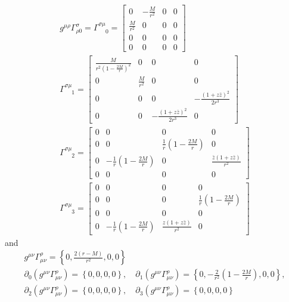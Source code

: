 \documentclass[12pt]{article}
\def\nn{\nonumber}
\begin{document}
\begin{gather}
g^{\mu\rho} \Gamma^{\sigma}_{\rho 0}
=
\Gamma^{\sigma \mu}_{\,\,\,\,\,\,\, 0}
=
\left[
\begin{array}{cccc}
0 & -\frac{M}{r^{2}} & 0 & 0
\\
\frac{M}{r^{2}} & 0 & 0 & 0
\\
0 & 0 & 0 & 0
\\
0 & 0 & 0 & 0
\end{array}
\right]
\nn \\
\Gamma^{\sigma \mu}_{\,\,\,\,\,\,\, 1}
=
\left[
\begin{array}{cccc}
\frac{M}{r^{2} (1 - \frac{2 M}{r})^{2}} & 0 & 0 & 0
\\
0 & \frac{M}{r^{2}} & 0 & 0
\\
0 & 0 & 0 & - \frac{(1 + z \bar{z})^{2}}{2 r^{3}}
\\
0 & 0 & - \frac{(1 + z \bar{z})^{2}}{2 r^{3}} & 0
\end{array}
\right]
\nn \\
\Gamma^{\sigma \mu}_{\,\,\,\,\,\,\, 2}
=
\left[
\begin{array}{cccc}
0 & 0 & 0 & 0
\\
0 & 0 & \frac{1}{r} (1 - \frac{2 M}{r}) & 0
\\
0 & -\frac{1}{r} (1 - \frac{2 M}{r}) & 0 & \frac{\bar{z} (1 + z \bar{z})}{r^{2}}
\\
0 & 0 & 0 & 0
\end{array}
\right]
\nn \\
\Gamma^{\sigma \mu}_{\,\,\,\,\,\,\, 3}
=
\left[
\begin{array}{cccc}
0 & 0 & 0 & 0
\\
0 & 0 & 0 & \frac{1}{r} (1 - \frac{2 M}{r}) 
\\
0 & 0 & 0 & 0
\\
0 & - \frac{1}{r} (1 - \frac{2 M}{r}) &  \frac{z (1 + z \bar{z})}{r^{2}}& 0
\end{array}
\right]
\end{gather}
and
\begin{gather}
g^{\mu\nu}
\Gamma^{\rho}_{\mu\nu}
=
\left\{
0, \frac{2 (r - M)}{r^{2}} , 0 , 0
\right\}
\nn \\
\partial_{0}\left(g^{\mu\nu}
\Gamma^{\rho}_{\mu\nu}\right)
=
\left\{
0,0,0,0
\right\}
,
\quad
\partial_{1}\left(g^{\mu\nu}
\Gamma^{\rho}_{\mu\nu}\right)
=
\left\{
0,- \frac{2}{r^{2}}(1 - \frac{2 M}{r}),0,0
\right\}
,
\nn \\
\partial_{2}\left(g^{\mu\nu}
\Gamma^{\rho}_{\mu\nu}\right)
=
\left\{
0, 0 , 0 ,0
\right\}
,
\quad
\partial_{3}\left(g^{\mu\nu}
\Gamma^{\rho}_{\mu\nu}\right)
=
\left\{
0,0,0,0
\right\}
\end{gather}
\end{document}
